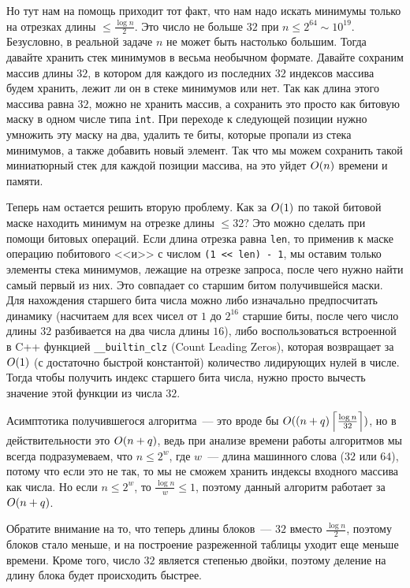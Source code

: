 Но тут нам на помощь приходит тот факт, что нам надо искать минимумы только на отрезках длины $\le \frac{\log n}{2}$. Это число не больше $32$ при $n \le 2^{64} \sim 10^{19}$. Безусловно, в реальной задаче $n$ не может быть настолько большим. Тогда давайте хранить стек минимумов в весьма необычном формате. Давайте сохраним массив длины $32$, в котором для каждого из последних $32$ индексов массива будем хранить, лежит ли он в стеке минимумов или нет. Так как длина этого массива равна $32$, можно не хранить массив, а сохранить это просто как битовую маску в одном числе типа \verb+int+. При переходе к следующей позиции нужно умножить эту маску на два, удалить те биты, которые пропали из стека минимумов, а также добавить новый элемент. Так что мы можем сохранить такой миниатюрный стек для каждой позиции массива, на это уйдет $O(n)$ времени и памяти.

Теперь нам остается решить вторую проблему. Как за $O(1)$ по такой битовой маске находить минимум на отрезке длины $\le 32$? Это можно сделать при помощи битовых операций. Если длина отрезка равна \verb+len+, то применив к маске операцию побитового <<и>> с числом \verb+(1 << len) - 1+, мы оставим только элементы стека  минимумов, лежащие на отрезке запроса, после чего нужно найти самый первый из них. Это совпадает со старшим битом получившейся маски. Для нахождения старшего бита числа можно либо изначально предпосчитать динамику (насчитаем для всех чисел от $1$ до $2^{16}$ старшие биты, после чего число длины $32$ разбивается на два числа длины $16$), либо воспользоваться встроенной в C++ функцией \verb+__builtin_clz+ (Count Leading Zeros), которая возвращает за $O(1)$ (с достаточно быстрой константой) количество лидирующих нулей в числе. Тогда чтобы получить индекс старшего бита числа, нужно просто вычесть значение этой функции из числа $32$.

Асимптотика получившегося алгоритма~--- это вроде бы $O((n + q) \left \lceil \frac{\log n}{32} \right\rceil)$, но в действительности это $O(n + q)$, ведь при анализе времени работы алгоритмов мы всегда подразумеваем, что $n \le 2^w$, где $w$~--- длина машинного слова ($32$ или $64$), потому что если это не так, то мы не сможем хранить индексы входного массива как числа. Но если $n \le 2^w$, то $\frac{\log n}{w} \le 1$, поэтому данный алгоритм работает за $O(n + q)$.

\begin{observation}
    Обратите внимание на то, что теперь длины блоков~--- $32$ вместо $\frac{\log n}{2}$, поэтому блоков стало меньше, и на построение разреженной таблицы уходит еще меньше времени. Кроме того, число $32$ является степенью двойки, поэтому деление на длину блока будет происходить быстрее.
\end{observation}

